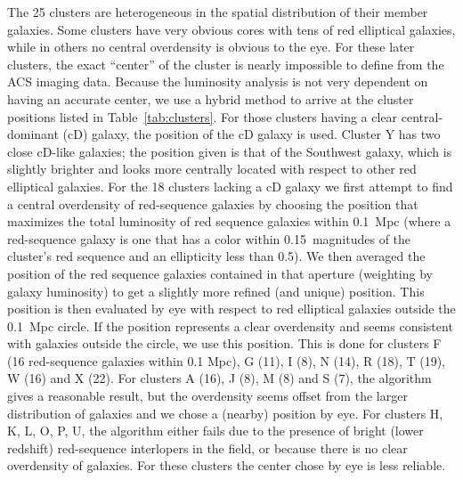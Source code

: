 
The 25 clusters are heterogeneous in the spatial distribution of their
member galaxies. Some clusters have very obvious cores with tens of
red elliptical galaxies, while in others no central overdensity is
obvious to the eye. For these later clusters, the exact ``center'' of
the cluster is nearly impossible to define from the ACS imaging
data. Because the luminosity analysis is not very dependent on having
an accurate center, we use a hybrid method to arrive at the cluster
positions listed in Table~\ref{tab:clusters}. For those clusters
having a clear central-dominant (cD) galaxy, the position of the cD
galaxy is used. Cluster Y has two close cD-like galaxies; the position
given is that of the Southwest galaxy, which is slightly brighter and
looks more centrally located with respect to other red elliptical
galaxies. For the 18 clusters lacking a cD galaxy we first attempt to
find a central overdensity of red-sequence galaxies by choosing the
position that maximizes the total luminosity of red sequence galaxies
within 0.1~Mpc (where a red-sequence galaxy is one that has a color
within 0.15~magnitudes of the cluster's red sequence and an
ellipticity less than 0.5). We then averaged the position of the red
sequence galaxies contained in that aperture (weighting by galaxy
luminosity) to get a slightly more refined (and unique) position. This
position is then evaluated by eye with respect to red elliptical
galaxies outside the 0.1~Mpc circle. If the position represents a
clear overdensity and seems consistent with galaxies outside the
circle, we use this position. This is done for clusters F (16
red-sequence galaxies within 0.1 Mpc), G (11), I (8), N (14), R (18),
T (19), W (16) and X (22). For clusters A (16), J (8), M (8) and S
(7), the algorithm gives a reasonable result, but the overdensity
seems offset from the larger distribution of galaxies and we chose a
(nearby) position by eye. For clusters H, K, L, O, P, U, the algorithm
either fails due to the presence of bright (lower redshift)
red-sequence interlopers in the field, or because there is no clear
overdensity of galaxies. For these clusters the center chose by eye is
less reliable.

